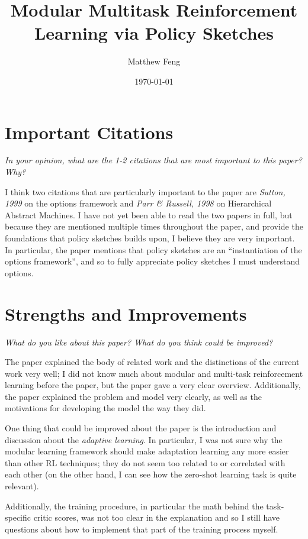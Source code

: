 \documentclass[a4paper,10pt]{article}
\title{Modular Multitask Reinforcement
Learning via Policy Sketches}
\date{\today}
\author{Matthew Feng}
\begin{document}
\maketitle

\section{Important Citations}
{\it
In your opinion, what are the 1-2 citations that
are most important to this paper? Why?\\
}

I think two citations that are particularly important
to the paper are {\it Sutton, 1999} on the
options framework and {\it Parr \& Russell, 1998} on
Hierarchical Abstract Machines. I have not yet been able to
read the two papers in full, but because they are mentioned
multiple times throughout the paper, and provide the foundations that
policy sketches builds upon, I believe they are very important.
In particular, the paper mentions that policy sketches are
an ``instantiation of the options framework'', and so to
fully appreciate policy sketches I must understand options.

\section{Strengths and Improvements}
{\it
What do you like about this paper?
What do you think could be improved?\\
}

The paper explained the body of related work and the distinctions
of the current work very well; I did not know much about modular
and multi-task reinforcement learning before the paper, but
the paper gave a very clear overview. Additionally, the paper
explained the problem and model very clearly, as well as the
motivations for developing the model the way they did.

One thing that could be improved about the paper is the introduction
and discussion about the {\it adaptive learning}. In particular,
I was not sure why the modular learning framework should make
adaptation learning any more easier than other RL techniques; they
do not seem too related to or correlated with each other (on the
other hand, I can see how the zero-shot learning task is 
quite relevant).

Additionally, the training procedure, in particular the math
behind the task-specific critic scores, was not too clear in
the explanation and so I still have questions about how
to implement that part of the training process myself.
\end{document}
